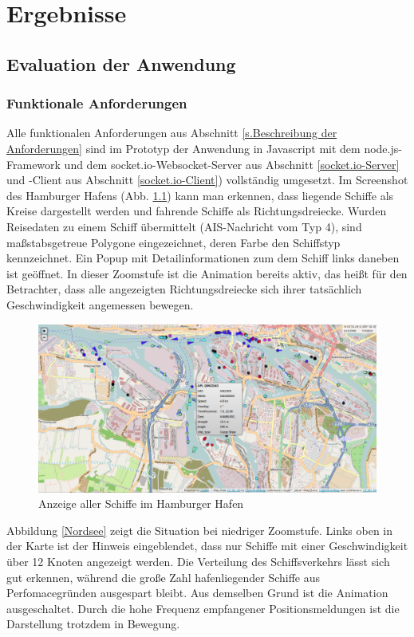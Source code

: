 \chapter{Ergebnisse}\label{Ergebnisse}

\section{Evaluation der Anwendung}\label{Evaluation der Anwendung}
\subsection{Funktionale Anforderungen}
Alle funktionalen Anforderungen aus Abschnitt \ref{s.Beschreibung der Anforderungen} sind im Prototyp der Anwendung in Javascript mit dem node.js-Framework und dem socket.io-Websocket-Server aus Abschnitt \ref{socket.io-Server} und -Client aus Abschnitt \ref{socket.io-Client}) vollständig umgesetzt. Im Screenshot des Hamburger Hafens (Abb. \ref{Hafen Hamburg}) kann man erkennen, dass liegende Schiffe als Kreise dargestellt werden und fahrende Schiffe als Richtungsdreiecke. Wurden Reisedaten zu einem Schiff übermittelt (AIS-Nachricht vom Typ 4), sind maßstabsgetreue Polygone eingezeichnet, deren Farbe den Schiffstyp kennzeichnet.
Ein Popup mit Detailinformationen zum dem Schiff links daneben ist geöffnet. In dieser Zoomstufe ist die Animation bereits aktiv, das heißt für den Betrachter, dass alle angezeigten Richtungsdreiecke sich ihrer tatsächlich Geschwindigkeit angemessen bewegen.

\begin {figure}[H]
\begin{center}
  \includegraphics[width=6in]{images/Hamburg.png}
\end{center}
\caption{Anzeige aller Schiffe im Hamburger Hafen}
\label{Hafen Hamburg}
\end {figure}
Abbildung \ref{Nordsee} zeigt die Situation bei niedriger Zoomstufe. Links oben in der Karte ist der Hinweis eingeblendet, dass nur Schiffe mit einer Geschwindigkeit über 12 Knoten angezeigt werden. Die Verteilung des Schiffsverkehrs lässt sich gut erkennen, während die große Zahl hafenliegender Schiffe aus Perfomacegründen ausgespart bleibt. Aus demselben Grund ist die Animation ausgeschaltet. Durch die hohe Frequenz empfangener Positionsmeldungen ist die Darstellung trotzdem in Bewegung.


